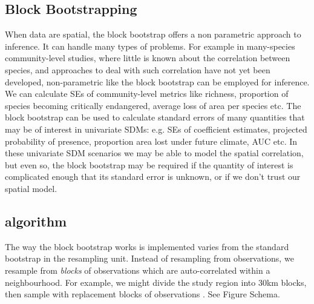 \documentclass[a4paper,12pt]{article}
\newcommand{\hilight}[1]{\colorbox{yellow}{#1}}
\begin{document}
\subsection{Block Bootstrapping}

When data are spatial, the block bootstrap offers a non parametric approach to inference. It can handle many types of problems. For example in many-species community-level studies, where little is known about the correlation between species, and approaches to deal with such correlation have not yet been developed, non-parametric like the block bootstrap can be employed for inference. We can calculate SEs of community-level metrics like richness, proportion of species becoming critically endangered, average loss of area per species etc. The block bootstrap can be used to calculate standard errors of many quantities that may be of interest in univariate SDMs: e.g. SEs of coefficient estimates, projected probability of presence, proportion area lost under future climate, AUC etc. In these univariate SDM scenarios we may be able to model the spatial correlation, but even so, the block bootstrap may be required if the quantity of interest is complicated enough that its standard error is unknown, or if we don't trust our spatial model.
 
\subsection{algorithm}

The way the block bootstrap works is implemented varies from the standard bootstrap in the resampling unit. Instead of resampling from observations, we resample from \emph{blocks} of observations which are auto-correlated within a neighbourhood. For example, we might divide the study region into 30km blocks, then sample with replacement blocks of observations . See Figure Schema. 



%
%
\end{document}
